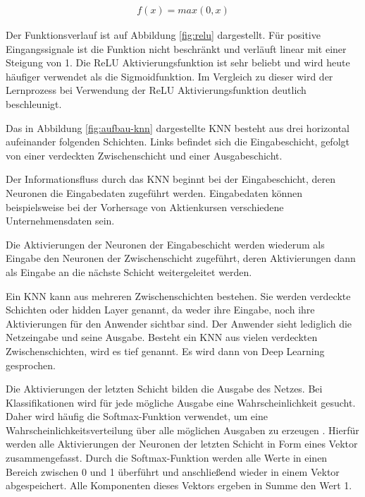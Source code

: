\begin{align}
	f(x) = max(0,x)
\end{align}

Der Funktionsverlauf ist auf Abbildung \ref{fig:relu} dargestellt. Für positive Eingangssignale ist die Funktion nicht beschränkt und verläuft linear mit einer Steigung von 1. Die ReLU Aktivierungsfunktion ist sehr beliebt und wird heute häufiger verwendet als die Sigmoidfunktion. Im Vergleich zu dieser wird der Lernprozess bei Verwendung der ReLU Aktivierungsfunktion deutlich beschleunigt. 

Das in Abbildung \ref{fig:aufbau-knn} dargestellte KNN besteht aus drei horizontal aufeinander folgenden Schichten. Links befindet sich die Eingabeschicht, gefolgt von einer verdeckten Zwischenschicht und einer Ausgabeschicht. 

Der Informationsfluss durch das KNN beginnt bei der Eingabeschicht, deren Neuronen die Eingabedaten zugeführt werden. Eingabedaten können beispielsweise bei der Vorhersage von Aktienkursen verschiedene Unternehmensdaten sein. 

Die Aktivierungen der Neuronen der Eingabeschicht werden wiederum als Eingabe den Neuronen der Zwischenschicht zugeführt, deren Aktivierungen dann als Eingabe an die nächste Schicht weitergeleitet werden. 

Ein KNN kann aus mehreren Zwischenschichten bestehen. Sie werden verdeckte Schichten oder hidden Layer genannt, da weder ihre Eingabe, noch ihre Aktivierungen für den Anwender sichtbar sind. Der Anwender sieht lediglich die Netzeingabe und seine Ausgabe. Besteht ein KNN aus vielen verdeckten Zwischenschichten, wird es tief genannt. Es wird dann von \glqq Deep Learning\grqq{} gesprochen. 

Die Aktivierungen der letzten Schicht bilden die Ausgabe des Netzes. Bei Klassifikationen wird für jede mögliche Ausgabe eine Wahrscheinlichkeit gesucht. Daher wird häufig die Softmax-Funktion verwendet, um eine Wahrscheinlichkeitsverteilung über alle möglichen Ausgaben zu erzeugen \cite{Goodfellow2016}. Hierfür werden alle Aktivierungen der Neuronen der letzten Schicht in Form eines Vektor zusammengefasst. Durch die Softmax-Funktion werden alle Werte in einen Bereich zwischen 0 und 1 überführt und anschließend wieder in einem Vektor abgespeichert. Alle Komponenten dieses Vektors ergeben in Summe den Wert 1. 

